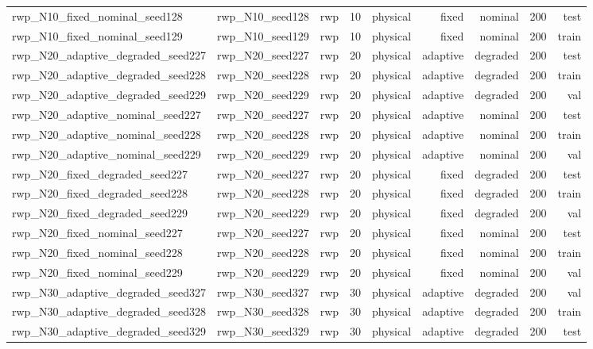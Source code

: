 \begin{tabular}{lrrrrrrrr}
rwp\_N10\_fixed\_nominal\_seed128 & rwp\_N10\_seed128 & rwp & 10 & physical & fixed & nominal & 200 & test \\
rwp\_N10\_fixed\_nominal\_seed129 & rwp\_N10\_seed129 & rwp & 10 & physical & fixed & nominal & 200 & train \\
rwp\_N20\_adaptive\_degraded\_seed227 & rwp\_N20\_seed227 & rwp & 20 & physical & adaptive & degraded & 200 & test \\
rwp\_N20\_adaptive\_degraded\_seed228 & rwp\_N20\_seed228 & rwp & 20 & physical & adaptive & degraded & 200 & train \\
rwp\_N20\_adaptive\_degraded\_seed229 & rwp\_N20\_seed229 & rwp & 20 & physical & adaptive & degraded & 200 & val \\
rwp\_N20\_adaptive\_nominal\_seed227 & rwp\_N20\_seed227 & rwp & 20 & physical & adaptive & nominal & 200 & test \\
rwp\_N20\_adaptive\_nominal\_seed228 & rwp\_N20\_seed228 & rwp & 20 & physical & adaptive & nominal & 200 & train \\
rwp\_N20\_adaptive\_nominal\_seed229 & rwp\_N20\_seed229 & rwp & 20 & physical & adaptive & nominal & 200 & val \\
rwp\_N20\_fixed\_degraded\_seed227 & rwp\_N20\_seed227 & rwp & 20 & physical & fixed & degraded & 200 & test \\
rwp\_N20\_fixed\_degraded\_seed228 & rwp\_N20\_seed228 & rwp & 20 & physical & fixed & degraded & 200 & train \\
rwp\_N20\_fixed\_degraded\_seed229 & rwp\_N20\_seed229 & rwp & 20 & physical & fixed & degraded & 200 & val \\
rwp\_N20\_fixed\_nominal\_seed227 & rwp\_N20\_seed227 & rwp & 20 & physical & fixed & nominal & 200 & test \\
rwp\_N20\_fixed\_nominal\_seed228 & rwp\_N20\_seed228 & rwp & 20 & physical & fixed & nominal & 200 & train \\
rwp\_N20\_fixed\_nominal\_seed229 & rwp\_N20\_seed229 & rwp & 20 & physical & fixed & nominal & 200 & val \\
rwp\_N30\_adaptive\_degraded\_seed327 & rwp\_N30\_seed327 & rwp & 30 & physical & adaptive & degraded & 200 & val \\
rwp\_N30\_adaptive\_degraded\_seed328 & rwp\_N30\_seed328 & rwp & 30 & physical & adaptive & degraded & 200 & train \\
rwp\_N30\_adaptive\_degraded\_seed329 & rwp\_N30\_seed329 & rwp & 30 & physical & adaptive & degraded & 200 & test \\

\end{tabular}

